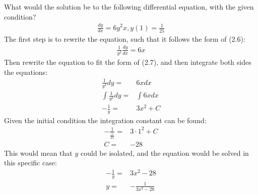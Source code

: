\begin{tcolorbox}[colback=red!5!white,colframe=red!55!black,title=Example using separable differential equation] 
What would the solution be to the following differential equation, with the given condition?
\begin{align*}
	\frac{dy}{dx} = 6y^2x, y(1)=\frac{1}{25}
\end{align*}
The first step is to rewrite the equation, such that it follows the form of (2.6):
\begin{align*}
	\frac{1}{y^2}\frac{dy}{dx}=6x
\end{align*}
Then rewrite the equation to fit the form of (2.7), and then integrate both sides the equations:
\begin{align*}
	\frac{1}{y^2}dy=&6x dx				\\
	\int \frac{1}{y^2}dy=&\int 6x dx		\\
	-\frac{1}{y}=&3x^2+C		
\end{align*}
Given the initial condition the integration constant can be found:
\begin{align*}
	-\frac{1}{\frac{1}{25}}=&3\cdot 1^2+C	\\
	C=&-28
\end{align*}
This would mean that $y$ could be isolated, and the equation would be solved in this specific case:
\begin{align*}
	-\frac{1}{y}=&3x^2-28\\
	y=&-\frac{1}{3x^2-28}
\end{align*}
\end{tcolorbox}


